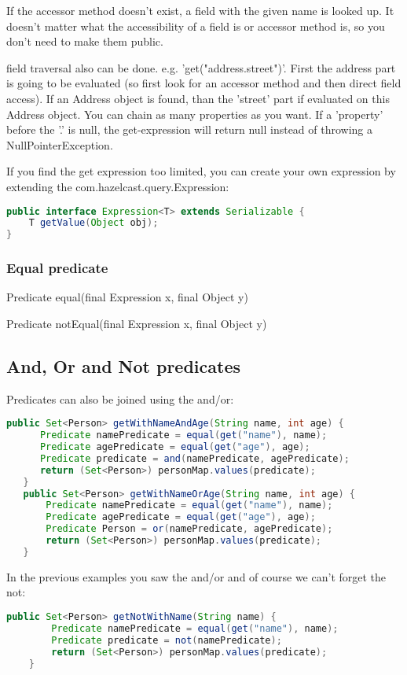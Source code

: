 If the accessor method doesn't exist, a field with the given name is looked up. It doesn't matter what the accessibility of a field is or accessor method is, so you don't need to make them public.

field traversal also can be done. e.g. 'get("address.street")'. First the address part is going to be evaluated (so first look for an accessor method and then direct field access). If an Address object is found, than the 'street' part if evaluated on this Address object. You can chain as many properties as you want. If a 'property' before the '.' is null, the get-expression will return null instead of throwing a NullPointerException.

If you find the get expression too limited, you can create your own expression by extending the com.hazelcast.query.Expression:
\begin{lstlisting}[language=java]
public interface Expression<T> extends Serializable {
    T getValue(Object obj);
}
\end{lstlisting}

\subsubsection{Equal predicate}

Predicate equal(final Expression x, final Object y)

Predicate notEqual(final Expression x, final Object y) 

\subsection{And, Or and Not predicates}
Predicates can also be joined using the and/or:
\begin{lstlisting}[language=java]
   public Set<Person> getWithNameAndAge(String name, int age) {
      Predicate namePredicate = equal(get("name"), name);
      Predicate agePredicate = equal(get("age"), age);
      Predicate predicate = and(namePredicate, agePredicate);
      return (Set<Person>) personMap.values(predicate);
   }
   public Set<Person> getWithNameOrAge(String name, int age) {
       Predicate namePredicate = equal(get("name"), name);
       Predicate agePredicate = equal(get("age"), age);
       Predicate Person = or(namePredicate, agePredicate);
       return (Set<Person>) personMap.values(predicate);
   }
\end{lstlisting}

In the previous examples you saw the and/or and of course we can't forget the not:
\begin{lstlisting}[language=java]
    public Set<Person> getNotWithName(String name) {
        Predicate namePredicate = equal(get("name"), name);
        Predicate predicate = not(namePredicate);
        return (Set<Person>) personMap.values(predicate);
    }
\end{lstlisting}

